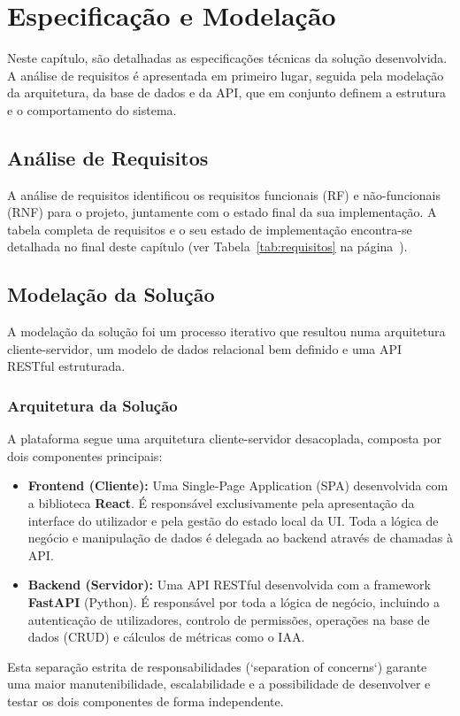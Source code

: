 \chapter{Especificação e Modelação}
\label{cha:especificacao_modelacao}

Neste capítulo, são detalhadas as especificações técnicas da solução desenvolvida. A análise de requisitos é apresentada em primeiro lugar, seguida pela modelação da arquitetura, da base de dados e da API, que em conjunto definem a estrutura e o comportamento do sistema.

\section{Análise de Requisitos}

A análise de requisitos identificou os requisitos funcionais (RF) e não-funcionais (RNF) para o projeto, juntamente com o estado final da sua implementação. A tabela completa de requisitos e o seu estado de implementação encontra-se detalhada no final deste capítulo (ver Tabela~\ref{tab:requisitos} na página~\pageref{tab:requisitos}).

\section{Modelação da Solução}

A modelação da solução foi um processo iterativo que resultou numa arquitetura cliente-servidor, um modelo de dados relacional bem definido e uma API RESTful estruturada.

\subsection{Arquitetura da Solução}

A plataforma segue uma arquitetura cliente-servidor desacoplada, composta por dois componentes principais:

\begin{itemize}
    \item \textbf{Frontend (Cliente):} Uma Single-Page Application (SPA) desenvolvida com a biblioteca \textbf{React}. É responsável exclusivamente pela apresentação da interface do utilizador e pela gestão do estado local da UI. Toda a lógica de negócio e manipulação de dados é delegada ao backend através de chamadas à API.
    \item \textbf{Backend (Servidor):} Uma API RESTful desenvolvida com a framework \textbf{FastAPI} (Python). É responsável por toda a lógica de negócio, incluindo a autenticação de utilizadores, controlo de permissões, operações na base de dados (CRUD) e cálculos de métricas como o IAA.
\end{itemize}
Esta separação estrita de responsabilidades (`separation of concerns`) garante uma maior manutenibilidade, escalabilidade e a possibilidade de desenvolver e testar os dois componentes de forma independente.

